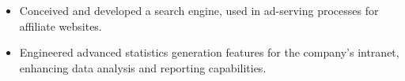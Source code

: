 \begin{itemize}
  \item Conceived and developed a search engine, used in ad-serving processes for affiliate websites. 
  \item Engineered advanced statistics generation features for the company’s intranet, enhancing data analysis and reporting capabilities.
\end{itemize}
\divider
